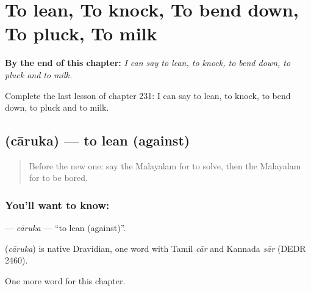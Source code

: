
\chapter{To lean, To knock, To bend down, To pluck, To milk}
\label{ch:ml-to-lean-to-knock-to-bend-down-to-pluck-to-milk}

\begin{chapteropening}
\textbf{By the end of this chapter:} \emph{I can say to lean, to knock, to bend down, to pluck and to milk.}

Complete the last lesson of chapter 231: I can say to lean, to knock, to bend down, to pluck and to milk.
\end{chapteropening}

\section[\texorpdfstring{\ml{ചാരുക} (cāruka)}{ചാരുക (cāruka)}]{ (cāruka) — to lean (against)}

\label{lesson:ML-C231-caruka}



\begin{quote}
Before the new one: say the Malayalam for to solve, then the Malayalam for to be bored.
\end{quote}

\subsection*{You'll want to know: }
\textbf{} — \emph{cāruka} — \textquotedblleft{}to lean (against)\textquotedblright{}.

\begin{cousinweb}
\textbf{} (\emph{cāruka}) is native Dravidian, one word with Tamil \emph{cār} and Kannada \emph{sār} (DEDR 2460).
\end{cousinweb}

\begin{grammarlens}[title={What you've built}]
One more word for this chapter.
\end{grammarlens}

